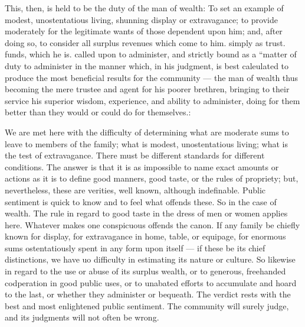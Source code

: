 \documentclass[11pt,openany]{book}
\begin{document}
This, then, is held to be the duty of the man of wealth: To set an example of modest, unostentatious living, shunning display or extravagance; to provide moderately for the legitimate wants of those dependent upon him; and, after doing so, to consider all surplus revenues which come to him. simply as trust. funds, which he is. called upon to administer, and strictly bound as a ``matter of duty to administer in the manner which, in his judgment, is best caleulated to produce the most beneficial results for the community --- the man of wealth thus becoming the mere trustee and agent for his poorer brethren, bringing to their service his superior wisdom, experience, and ability to administer, doing for them better than they would or could do for themselves.:

We are met here with the difficulty of determining what are moderate sums to leave to members of the family; what is modest, unostentatious living; what is the test of extravagance. There must be different standards for different conditions. The answer is that it is as impossible to name exact amounts or actions as it is to define good manners, good taste, or the rules of propriety; but, nevertheless, these are verities, well known, although indefinable. Public sentiment is quick to know and to feel what offends these. So in the case of wealth. The rule in regard to good taste in the dress of men or women applies here. Whatever makes one conspicuous offends the canon. If any family be chiefly known for display, for extravagance in home, table, or equipage, for enormous sums ostentatiously spent in any form upon itself --- if these be its chief distinctions, we have uo difficulty in estimating its nature or culture. So likewise in regard to the use or abuse of its surplus wealth, or to generous, freehanded codperation in good public uses, or to unabated efforts to accumulate and hoard to the last, or whether they administer or bequeath. The verdict rests with the best and most enlightened public sentiment. The community will surely judge, and its judgments will not often be wrong.
\end{document}
